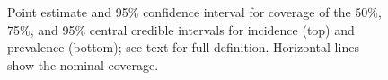 \documentclass[thesis.tex]{subfiles}
\begin{document}
\begin{figure}
    \vspace{-3cm}
    \caption[Coverage of simulation study (derived quantities)]{%
        Point estimate and 95\% confidence interval for coverage of the 50\%, 75\%, and 95\% central credible intervals for incidence (top) and prevalence (bottom); see text for full definition.
        Horizontal lines show the nominal coverage.
    }
    \label{SEIR:fig:sim-inc-prev}
\end{figure}
\end{document}
